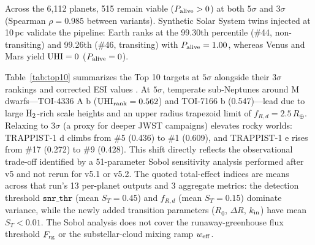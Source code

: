 \documentclass[linenumbers]{aastex702}
\begin{document}
Across the 6,112 planets, 515 remain viable ($P_{\rm alive} > 0$) at both $5\sigma$ and $3\sigma$ (Spearman $\rho = 0.985$ between variants). Synthetic Solar System twins injected at 10\,pc validate the pipeline: Earth ranks at the 99.30th percentile (\#44, non-transiting) and 99.26th (\#46, transiting) with $P_{\rm alive} = 1.00$, whereas Venus and Mars yield ${\rm UHI} = 0$ ($P_{\rm alive} = 0$).

Table~\ref{tab:top10} summarizes the Top 10 targets at $5\sigma$ alongside their $3\sigma$ rankings and corrected ESI values \citep{SchulzeMakuch2011}. At $5\sigma$, temperate sub-Neptunes around M dwarfs---TOI-4336 A b (${\rm UHI}_{\rm rank} = 0.562$) and TOI-7166 b (0.547)---lead due to large ${\rm H}_2$-rich scale heights and an upper radius trapezoid limit of $f_{R,d} = 2.5\,R_\oplus$. Relaxing to $3\sigma$ (a proxy for deeper JWST campaigns) elevates rocky worlds: TRAPPIST-1 d climbs from \#5 (0.436) to \#1 (0.609), and TRAPPIST-1 e rises from \#17 (0.272) to \#9 (0.428). This shift directly reflects the observational trade-off identified by a 51-parameter Sobol sensitivity analysis \citep[SALib;][]{Herman2017} performed after v5 and not rerun for v5.1 or v5.2. The quoted total-effect indices are means across that run's 13 per-planet outputs and 3 aggregate metrics: the detection threshold $\mathtt{snr\_thr}$ (mean $S_T = 0.45$) and $f_{R,d}$ (mean $S_T = 0.15$) dominate variance, while the newly added transition parameters ($R_0$, $\Delta R$, $k_{\rm in}$) have mean $S_T < 0.01$. The Sobol analysis does not cover the runaway-greenhouse flux threshold $F_{\rm rg}$ or the substellar-cloud mixing ramp $w_{\rm eff}$.
\end{document}
